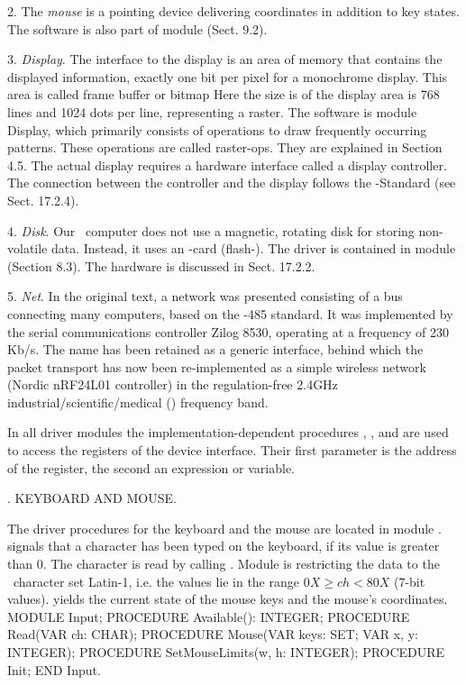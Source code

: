 2. The \emph{mouse} is a pointing device delivering coordinates in addition to key states. The software is also part of module  (Sect. 9.2).

3. \emph{Display}. The interface to the display is an area of memory that contains the displayed information, exactly one bit per pixel for a monochrome display. This area is called frame buffer or bitmap Here the size is of the display area is 768 lines and 1024 dots per line, representing a raster. The software is module Display, which primarily consists of operations to draw frequently occurring patterns. These operations are called raster-ops. They are explained in Section 4.5. The actual display requires a hardware interface called a display controller. The connection between the controller and the display follows the -Standard (see Sect. 17.2.4).

4. \emph{Disk}. Our \RISC\ computer does not use a magnetic, rotating disk for storing non-volatile data. Instead, it uses an -card (flash-). The driver is contained in module  (Section 8.3). The hardware is discussed in Sect. 17.2.2.

5. \emph{Net}. In the original text, a network was presented consisting of a bus connecting many computers, based on the -485 standard. It was implemented by the serial communications controller Zilog 8530, operating at a frequency of 230 Kb/s. The name  has been retained as a generic interface, behind which the packet transport has now been re-implemented as a simple wireless network (Nordic nRF24L01 controller) in the regulation-free 2.4GHz industrial/scientific/medical () frequency band.

In all driver modules the implementation-dependent procedures , , and  are used to access the registers of the device interface. Their first parameter is the address of the register, the second an expression or variable.

. KEYBOARD AND MOUSE.

The driver procedures for the keyboard and the mouse are located in module .  signals that a character has been typed on the keyboard, if its value is greater than 0. The character is read by calling . Module  is restricting the data to the \ASCII\ character set Latin-1, i.e. the values lie in the range $0X \ge ch < 80X$ (7-bit values).  yields the current state of the mouse keys and the mouse's coordinates.
\begintt
MODULE Input;
PROCEDURE Available(): INTEGER;
PROCEDURE Read(VAR ch: CHAR);
PROCEDURE Mouse(VAR keys: SET; VAR x, y: INTEGER);
PROCEDURE SetMouseLimits(w, h: INTEGER);
PROCEDURE Init;
END Input.
\endtt

